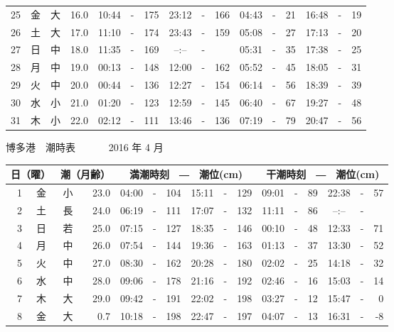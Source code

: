 \documentclass[12pt.a4j]{jsarticle}
\begin{document}
\begin{center}
\begin{table}[ht]
\begin{tabular}{|rc|cr|ccrccr|ccrccr|}
25 & 金 & 大 & 16.0 &  10:44 &-& 175  &  23:12 &-& 166  &   04:43 &-&  21  &   16:48 &-&  19  \\
26 & 土 & 大 & 17.0 &  11:10 &-& 174  &  23:43 &-& 159  &   05:08 &-&  27  &   17:13 &-&  20  \\
27 & 日 & 中 & 18.0 &  11:35 &-& 169  &  --:-- &-&     &   05:31 &-&  35  &   17:38 &-&  25  \\
28 & 月 & 中 & 19.0 &  00:13 &-& 148  &  12:00 &-& 162  &   05:52 &-&  45  &   18:05 &-&  31  \\
29 & 火 & 中 & 20.0 &  00:44 &-& 136  &  12:27 &-& 154  &   06:14 &-&  56  &   18:39 &-&  39  \\
30 & 水 & 小 & 21.0 &  01:20 &-& 123  &  12:59 &-& 145  &   06:40 &-&  67  &   19:27 &-&  48  \\
31 & 木 & 小 & 22.0 &  02:12 &-& 111  &  13:46 &-& 136  &   07:19 &-&  79  &   20:47 &-&  56  \\
   \hline
   \end{tabular}
\end{table}
\newpage
 {\LARGE 博多港　潮時表　　　}
 {\large 2016 年  4 月}\\
 \begin{table}[ht]
    \begin{tabular}{|rc|cr|ccrccr|ccrccr|}
    \hline
    \multicolumn{2}{|c|}{日（曜）} & \multicolumn{2}{c|}{潮（月齢）} & \multicolumn{6}{c|}{満潮時刻　―　潮位(cm)} & \multicolumn{6}{c|}{干潮時刻　―　潮位(cm)} \\
 \hline
 1 & 金 & 小 & 23.0 &  04:00 &-& 104  &  15:11 &-& 129  &   09:01 &-&  89  &   22:38 &-&  57  \\
 2 & 土 & 長 & 24.0 &  06:19 &-& 111  &  17:07 &-& 132  &   11:11 &-&  86  &   --:-- &-&     \\
 3 & 日 & 若 & 25.0 &  07:15 &-& 127  &  18:35 &-& 146  &   00:10 &-&  48  &   12:33 &-&  71  \\
 4 & 月 & 中 & 26.0 &  07:54 &-& 144  &  19:36 &-& 163  &   01:13 &-&  37  &   13:30 &-&  52  \\
 5 & 火 & 中 & 27.0 &  08:30 &-& 162  &  20:28 &-& 180  &   02:02 &-&  25  &   14:18 &-&  32  \\
 6 & 水 & 中 & 28.0 &  09:06 &-& 178  &  21:16 &-& 192  &   02:46 &-&  16  &   15:03 &-&  14  \\
 7 & 木 & 大 & 29.0 &  09:42 &-& 191  &  22:02 &-& 198  &   03:27 &-&  12  &   15:47 &-&   0  \\
 8 & 金 & 大 &  0.7 &  10:18 &-& 198  &  22:47 &-& 197  &   04:07 &-&  13  &   16:31 &-&  -8  \\

\end{tabular}
\end{table}
\end{center}
\end{document}

